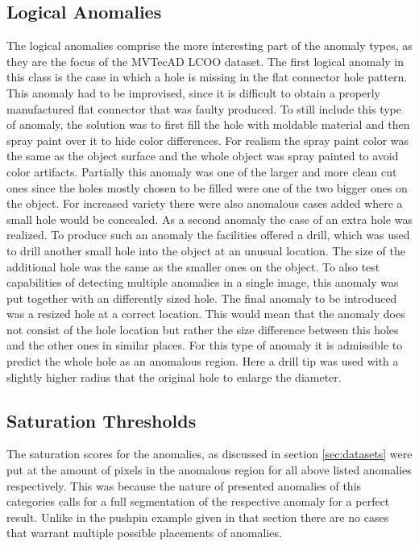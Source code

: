 \subsection{Logical Anomalies}
The logical anomalies comprise the more interesting part of the anomaly types, as they are the focus of the MVTecAD LCOO dataset. The first logical anomaly in this class is the case in which a hole 
is missing in the flat connector hole pattern. This anomaly had to be improvised, since it is difficult to obtain a properly manufactured flat connector that was faulty produced. To still include 
this type of anomaly, the solution was to first fill the hole with moldable material and then spray paint over it to hide color differences. For realism the spray paint color was the same as the 
object surface and the whole object was spray painted to avoid color artifacts. Partially this anomaly was one of the larger and more clean cut ones since the holes mostly chosen to be filled were one of the two 
bigger ones on the object. For increased variety there were also anomalous cases added where a small hole would be concealed. As a second anomaly the case of an extra hole was realized. To produce such an anomaly the facilities offered a drill, which was used to drill another small hole into 
the object at an unusual location. The size of the additional hole was the same as the smaller ones on the object. To also test capabilities of detecting multiple anomalies in a single image, this anomaly 
was put together with an differently sized hole. The final anomaly to be introduced was a resized hole at a correct 
location. This would mean that the anomaly does not consist of the hole location but rather the size difference between this holes and the other ones in similar places. For this type of anomaly it 
is admissible to predict the whole hole as an anomalous region.  %
Here a drill tip was used with a slightly higher radius that the original hole to enlarge the diameter.


\subsection{Saturation Thresholds}

The saturation scores for the anomalies, as discussed in section \ref{sec:datasets} were put at the amount of pixels in the anomalous region for all above listed anomalies respectively.
This was because the nature of presented anomalies of this categories calls for a full segmentation of the respective anomaly for a perfect result. Unlike in the pushpin example given in that section 
there are no cases that warrant multiple possible placements of anomalies.






